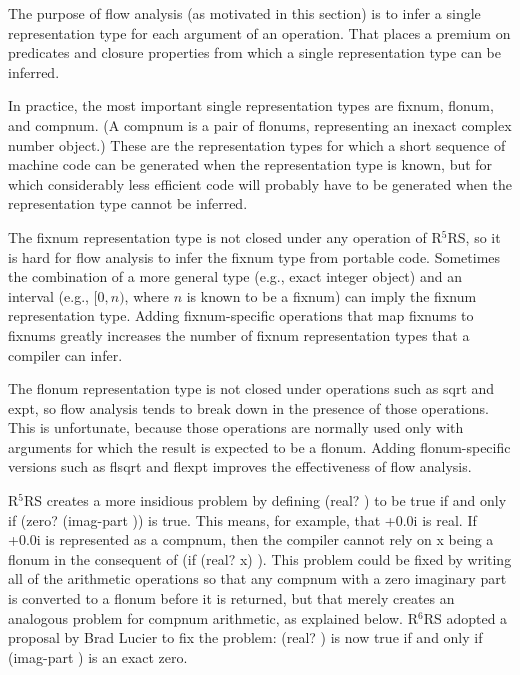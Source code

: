 \documentclass[twoside,twocolumn]{algol60}
\newcommand{\rn}[1]{R$^{#1}$RS}
\begin{document}
The purpose of flow analysis (as motivated in this section) is to infer a
single representation type for each argument of an operation.  That
places a premium on predicates and closure properties from which a
single representation type can be inferred.

In practice, the most important single representation types are
fixnum, flonum, and compnum.  (A compnum is a pair of flonums,
representing an inexact complex number object.)  These are the representation
types for which a short sequence of machine code can be generated when
the representation type is known, but for which considerably less
efficient code will probably have to be generated when the
representation type cannot be inferred.

The fixnum representation type is not closed under any operation of
\rn{5}, so it is hard for flow analysis to infer the fixnum type from
portable code.  Sometimes the combination of a more general type (e.g.,
exact integer object) and an interval (e.g., $[0,n)$, where $n$ is known to
be a fixnum) can imply the fixnum representation type.  Adding
fixnum-specific operations that map fixnums to fixnums 
greatly increases the number of fixnum
representation types that a compiler can infer.

The flonum representation type is not closed under operations such as
{\cf sqrt} and {\cf expt}, so flow analysis tends to break down in the
presence of those operations.  This is unfortunate, because those
operations are normally used only with arguments for which the result
is expected to be a flonum.  Adding flonum-specific versions such as
{\cf flsqrt} and {\cf flexpt} improves the effectiveness of flow
analysis.

\rn{5} creates a more insidious problem by defining {\cf (real?
  )} to be true if and only if {\cf (zero? (imag-part
  ))} is true.  This means, for example, that {+0.0i}
is real.  If {+0.0i} is represented as a compnum, then the
compiler cannot rely on {\cf x} being a flonum in the consequent
of {\cf (if (real? x)  )}.  This
problem could be fixed by writing all of the arithmetic operations so
that any compnum with a zero imaginary part is converted to a flonum
before it is returned, but that merely creates an analogous problem
for compnum arithmetic, as explained below.  \rn{6} adopted a proposal
by Brad Lucier to fix the problem: {\cf (real? )} is now true
if and only if {\cf (imag-part )} is an exact zero.
\end{document}
